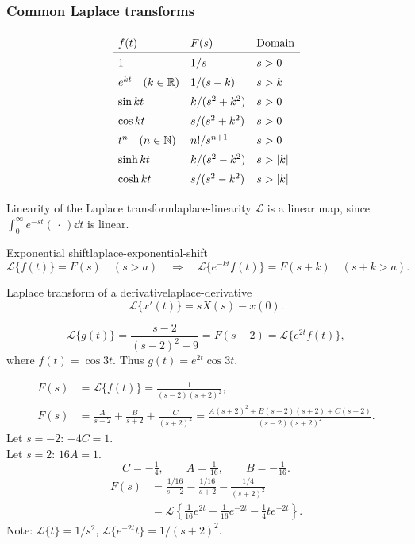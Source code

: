 \subsubsection*{Common Laplace transforms}
\[
  \renewcommand{\arraystretch}{1.45}
  \begin{array}{lll}
    f(t)                & F(s)        & \text{Domain} \\ \hline
    1                   & 1/s         & s>0           \\
    e^{kt}\quad(k\in\R) & 1/(s-k)     & s>k           \\
    \sin kt             & k/(s^2+k^2) & s>0           \\
    \cos kt             & s/(s^2+k^2) & s>0           \\
    t^n\quad(n\in\N)    & n!/s^{n+1}  & s>0           \\
    \sinh kt            & k/(s^2-k^2) & s>|k|         \\
    \cosh kt            & s/(s^2-k^2) & s>|k|
  \end{array}
\]

\begin{theorem}{Linearity of the Laplace transform}{laplace-linearity}
  $\mathcal L$ is a linear map, since $\int_0^\infty e^{-st}(\,\cdot\,)\dd t$ is linear.
\end{theorem}

\begin{theorem}{Exponential shift}{laplace-exponential-shift}
  \[
    \mathcal L\{f(t)\}=F(s)\quad(s>a)
    \quad\Rightarrow\quad
    \mathcal L\{e^{-kt}f(t)\}=F(s+k)\quad(s+k>a).
  \]
\end{theorem}

\begin{theorem}{Laplace transform of a derivative}{laplace-derivative}
  \[\mathcal L\{x'(t)\}=sX(s)-x(0).\]
\end{theorem}

\begin{example}
  \[
    \mathcal L\{g(t)\}=\frac{s-2}{(s-2)^2+9}
    =F(s-2)=\mathcal L\{e^{2t}f(t)\},
  \]
  where $f(t)=\cos 3t$. Thus $g(t)=e^{2t}\cos 3t$.
\end{example}

\begin{example}
  \begin{align*}
    F(s) & =\mathcal L\{f(t)\}=\frac1{(s-2)(s+2)^2},   \\
    F(s) & =\frac A{s-2}+\frac B{s+2}+\frac C{(s+2)^2}
    =\frac{A(s+2)^2+B(s-2)(s+2)+C(s-2)}{(s-2)(s+2)^2}.
  \end{align*}
  Let $s=-2$: $-4C=1$.\\
  Let $s=2$: $16A=1$.
  \[
    C=-\tfrac14,\qquad A=\tfrac1{16},\qquad B=-\tfrac1{16}.
  \]
  \begin{align*}
    F(s) & =\frac{1/16}{s-2}-\frac{1/16}{s+2}-\frac{1/4}{(s+2)^2}                            \\
         & =\mathcal L\left\{\tfrac1{16}e^{2t}-\tfrac1{16}e^{-2t}-\tfrac14 te^{-2t}\right\}.
  \end{align*}
  Note: $\mathcal L\{t\}=1/s^2$, $\mathcal L\{e^{-2t}t\}=1/(s+2)^2$.
\end{example}

